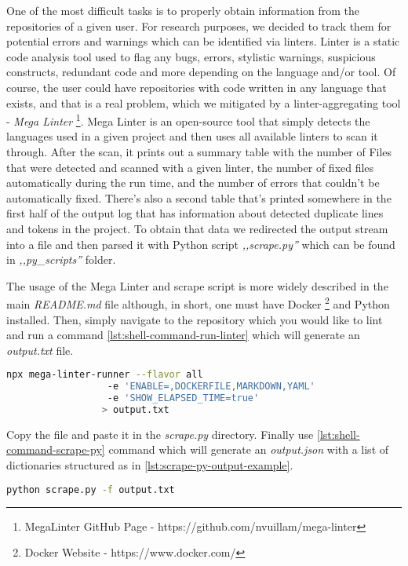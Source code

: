 \documentclass[graybox]{svmult}
\begin{document}
One of the most difficult tasks is to properly obtain information from the repositories of a given user. For research purposes, we decided to track them for potential errors and warnings which can be identified via linters. Linter is a static code analysis tool used to flag any bugs, errors, stylistic warnings, suspicious constructs, redundant code and more depending on the language and/or tool. Of course, the user could have repositories with code written in any language that exists, and that is a real problem, which we mitigated by a linter-aggregating tool - \emph{Mega Linter} \footnote{MegaLinter GitHub Page - https://github.com/nvuillam/mega-linter}. Mega Linter is an open-source tool that simply detects the languages used in a given project and then uses all available linters to scan it through. After the scan, it prints out a summary table with the number of Files that were detected and scanned with a given linter, the number of fixed files automatically during the run time, and the number of errors that couldn't be automatically fixed. There's also a second table that's printed somewhere in the first half of the output log that has information about detected duplicate lines and tokens in the project. To obtain that data we redirected the output stream into a file and then parsed it with Python script \emph{,,scrape.py''} which can be found in \emph{,,py\_scripts''} folder.

The usage of the Mega Linter and scrape script is more widely described in the main \emph{README.md} file although, in short, one must have Docker \footnote{Docker Website - https://www.docker.com/} and Python installed. Then, simply navigate to the repository which you would like to lint and run a command \ref{lst:shell-command-run-linter} which will generate an \emph{output.txt} file.

\begin{lstlisting}[language=Bash, label={lst:shell-command-run-linter}]
npx mega-linter-runner --flavor all
                  -e 'ENABLE=,DOCKERFILE,MARKDOWN,YAML'
                  -e 'SHOW_ELAPSED_TIME=true'
                 > output.txt
\end{lstlisting}

Copy the file and paste it in the \emph{scrape.py} directory. Finally use \ref{lst:shell-command-scrape-py} command which will generate an \emph{output.json} with a list of dictionaries structured as in \ref{lst:scrape-py-output-example}.

\begin{lstlisting}[language=Bash, label={lst:shell-command-scrape-py}]
python scrape.py -f output.txt
\end{lstlisting}
\end{document}
